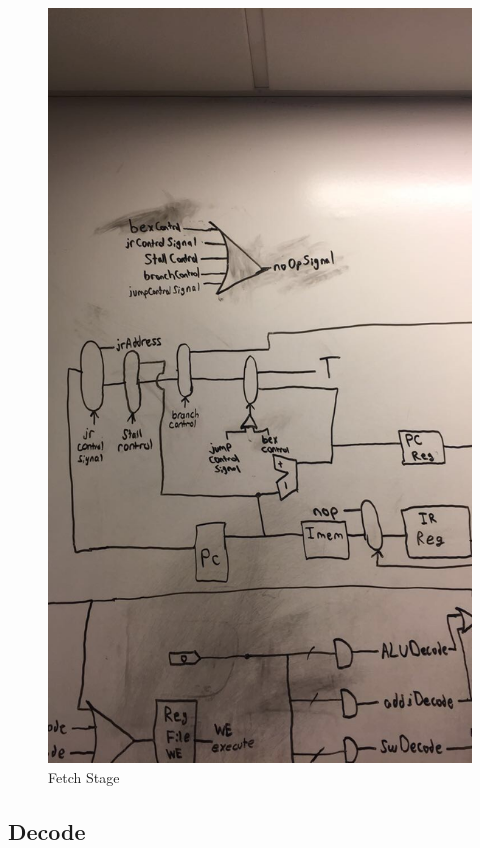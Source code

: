 \documentclass[letterpaper]{article} %
\begin{document}
           \FloatBarrier

  \begin{figure}[!htb]
        \includegraphics[scale=.45]{Fetch.jpg}
        \caption{Fetch Stage}
        \label{fig:2}
    \end{figure}
    
       \FloatBarrier

\subsection{Decode}
\end{document}
